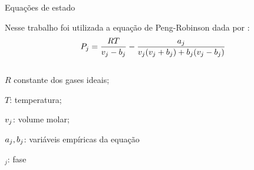 \documentclass[professionalfont]{beamer}
\begin{document}
\begin{frame}{Equações de estado}



    
    Nesse trabalho foi utilizada a equação de Peng-Robinson dada por \cite{Chen2007}:
    \begin{equation}
        \label{eq:eos.1}
        P_{j} = \dfrac{R T}{v_{j} - b_{j}} - \dfrac{a_{j}}{v_{j}(v_{j} + b_{j}) + b_{j}(v_{j} - b_{j})}
    \end{equation}
    \begin{columns}
        \begin{column}{0.6\textwidth}
            \begin{description}[]
                \item $R$ constante dos gases ideais;
                \item $T$: temperatura;
                \item $v_{j}$: volume molar;
                \item $a_{j}, b_{j}$: variáveis empíricas da equação
                \item $_{j}$: fase
            \end{description}
        \end{column}
    \end{columns}
    
\end{frame}



\end{document}
